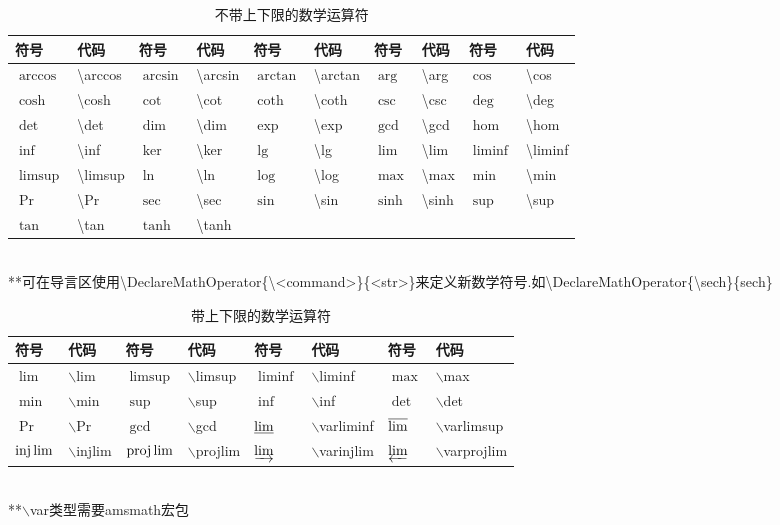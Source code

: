 \documentclass[UTF8,fontset=ubuntu]{ctexart}
\begin{document}
\begin{table}[H]
\begin{tabular}{l l l l l l l l l l}
    \hline
    符号 & 代码 & 符号 & 代码 & 符号 & 代码 & 符号 & 代码 & 符号 & 代码\\
    \hline
    $\arccos$ & \textbackslash arccos & $\arcsin$ & \textbackslash arcsin & $\arctan$ & \textbackslash arctan & $\arg$ & \textbackslash arg & $\cos$ & \textbackslash cos\\
    $\cosh$ & \textbackslash cosh & $\cot$ & \textbackslash cot & $\coth$ & \textbackslash coth & $\csc$ & \textbackslash csc & $\deg$ & \textbackslash deg\\
    $\det$ & \textbackslash det & $\dim$ & \textbackslash dim & $\exp$ & \textbackslash exp & $\gcd$ & \textbackslash gcd & $\hom$ & \textbackslash hom\\
    $\inf$ & \textbackslash inf & $\ker$ & \textbackslash ker & $\lg$ & \textbackslash lg & $\lim$ & \textbackslash lim & $\liminf$ & \textbackslash liminf\\
    $\limsup$ & \textbackslash limsup & $\ln$ & \textbackslash ln & $\log$ & \textbackslash log & $\max$ & \textbackslash max & $\min$ & \textbackslash min\\
    $\Pr$ & \textbackslash Pr & $\sec$ & \textbackslash sec & $\sin$ & \textbackslash sin & $\sinh$ & \textbackslash sinh & $\sup$ & \textbackslash sup\\
    $\tan$ & \textbackslash tan & $\tanh$ & \textbackslash tanh\\
    \hline
\end{tabular}\\[2mm]
**可在导言区使用\textbackslash DeclareMathOperator\{\textbackslash \textless command\textgreater\}\{\textless str\textgreater\}来定义新数学符号.如\textbackslash DeclareMathOperator\{\textbackslash sech\}\{sech\}
\caption{不带上下限的数学运算符}
\end{table}

\begin{table}[H]
\begin{tabular}{l l l l l l l l}
	\hline
	符号 & 代码 & 符号 & 代码 & 符号 & 代码 & 符号 & 代码\\
	\hline
	$\lim$ & $\backslash$lim & $\limsup$ & $\backslash$limsup & $\liminf$ & $\backslash$liminf & $\max$ & $\backslash$max\\
	$\min$ & $\backslash$min & $\sup$ & $\backslash$sup & $\inf$ & $\backslash$inf & $\det$ & $\backslash$det\\
	$\Pr$ & $\backslash$Pr & $\gcd$ & $\backslash$gcd & $\varliminf$ & $\backslash$varliminf & $\varlimsup$ & $\backslash$varlimsup\\
	$\injlim$ & $\backslash$injlim & $\projlim$ & $\backslash$projlim & $\varinjlim$ & $\backslash$varinjlim & $\varprojlim$ & $\backslash$varprojlim\\
	\hline
\end{tabular}\\[2mm]
**$\backslash$var类型需要amsmath宏包
\caption{带上下限的数学运算符}
\end{table}
\end{document}
